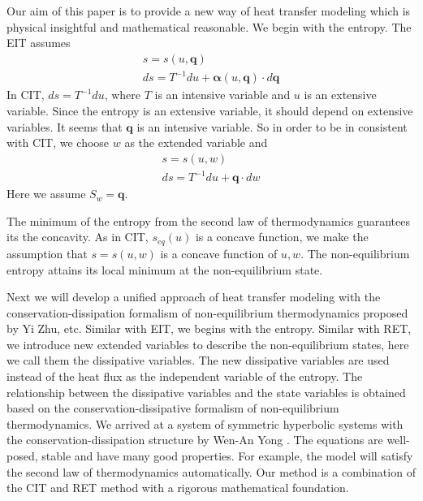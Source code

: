 \documentclass[a4paper]{article}
\begin{document}
Our aim of this paper is to provide a new way of heat transfer modeling which is physical insightful and mathematical reasonable. We begin with the entropy. 
The EIT assumes 
\begin{eqnarray}
s=s(u,\mathbf{q}) \\ ds=T^{-1}du+\mathbf{\alpha}(u,\mathbf{q}) \cdot d\mathbf{q} 
\end{eqnarray}
In CIT, $ds=T^{-1}du$, where $T$ is an intensive variable and $u$ is an extensive variable. Since the entropy is an extensive variable, it should depend on extensive variables. It seems that $\mathbf{q}$ is an intensive variable. So in order to be in consistent with CIT, we choose $w$ as the extended variable and 
\begin{eqnarray}
s=s(u,w) \\ ds=T^{-1} du+\mathbf{q} \cdot dw
\end{eqnarray}
Here we assume $S_w=\mathbf{q}$. 

The minimum of the entropy from the second law of thermodynamics guarantees its the concavity. As in CIT, $s_{eq}(u)$ is a concave function, we make the assumption that $s=s(u,w)$ is a concave function of $u,w$. The non-equilibrium entropy attains its local minimum at the non-equilibrium state. 
 
 Next we will develop a unified approach of heat transfer modeling with the conservation-dissipation formalism of non-equilibrium thermodynamics proposed by Yi Zhu, etc.\cite{zhu2014conservation} Similar with EIT, we begins with the entropy. Similar with RET, we introduce new extended variables to describe the non-equilibrium states, here we call them the dissipative variables. The new dissipative variables are used instead of the heat flux as the independent variable of the entropy. The relationship between the dissipative variables and the state variables is obtained based on the conservation-dissipative formalism of non-equilibrium thermodynamics. We arrived at a system of symmetric hyperbolic systems with the conservation-dissipation structure by Wen-An Yong \cite{yong2008interesting}. The equations are well-posed, stable and have many good properties. For example, the  model will satisfy the second law of thermodynamics automatically. Our method is a combination of the CIT and RET method with a rigorous mathematical foundation. 
\end{document}
